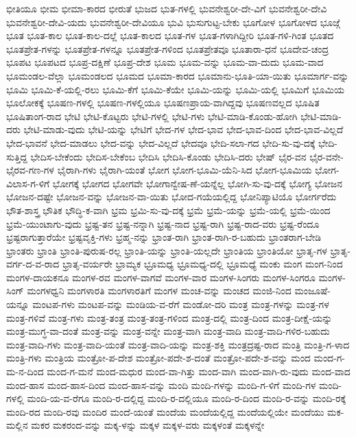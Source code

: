 {ಭೀತಿಯೂ
ಭೀಮ
ಭೀಮಾ-ಕಾರದ
ಭೀರುತೆ
ಭುಜದ
ಭುತ-ಗಳಲ್ಲಿ
ಭುವನೇಶ್ವರೀ-ದೇ-ವಿಗೆ
ಭುವನೇಶ್ವರೀ-ದೇವಿ
ಭುವನೇಶ್ವರೀ-ದೇವಿ-ಯದು
ಭುವನೇಶ್ವರೀ-ದೇವಿಯೂ
ಭುವಿ
ಭುಸುಗುಟ್ಟ-ಬೇಕು
ಭೂಗೋಳ
ಭೂಗೋಳದ
ಭೂಜ್ಗೆ
ಭೂತ
ಭೂತ-ಕಾಲ
ಭೂತ-ಕಾಲ-ದಲ್ಲೆ
ಭೂತ-ಕಾಲದ
ಭೂತ-ಗಳ
ಭೂತ-ಗಳಾಗಿದ್ದೀರಿ
ಭೂತ-ಗಳಿ-ಗಿಂತ
ಭೂತದ
ಭೂತಪ್ರೇತ-ಗಳನ್ನು
ಭೂತಪ್ರೇತ-ಗಳನ್ನೂ
ಭೂತಪ್ರೇತ-ಗಳಿಂದ
ಭೂತಪ್ರೇತವೂ
ಭೂತಾರಾ-ಧನೆ
ಭೂದೇವ-ಚಂದ್ರ
ಭೂಪಟ
ಭೂಪಟದ
ಭೂಪ್ರ-ದಕ್ಷಿಣೆ
ಭೂಪ್ರ-ದೇಶ
ಭೂಮ
ಭೂಮ-ವನ್ನು
ಭೂಮ-ವಾ-ದುದು
ಭೂಮ-ವಾದ
ಭೂಮಂಡಲ-ವೆಲ್ಲಾ
ಭೂಮಂಡಲದ
ಭೂಮದ
ಭೂಮಾ-ಕಾರದ
ಭೂಮಾನು-ಭೂತಿ-ಯಾ-ಯಿತು
ಭೂಮಾರ್ಗ-ವನ್ನು
ಭೂಮಿ
ಭೂಮಿ-ಕೆ-ಯಲ್ಲಿ-ರಲು
ಭೂಮಿ-ಕೆಗೆ
ಭೂಮಿ-ಕೆಯೇ
ಭೂಮಿ-ಯನ್ನು
ಭೂಮಿ-ಯಲ್ಲಿ
ಭೂಮಿಗೆ
ಭೂಮಿಯ
ಭೂಲೋಕಕ್ಕೆ
ಭೂಷಣ-ಗಳಲ್ಲಿ
ಭೂಷಣ-ಗಳಲ್ಲಿಯೂ
ಭೂಷಣಪ್ರಾಯ-ವಾಗಿದ್ದವು
ಭೂಷಣವಲ್ಲದ
ಭೂಷಿತ
ಭೂಷಿತಾಂಗ-ರಾದ
ಭೇಟಿ
ಭೇಟಿ-ಕೊಟ್ಟರು
ಭೇಟಿ-ಗಳಲ್ಲಿ
ಭೇಟಿ-ಗಳು
ಭೇಟಿ-ಮಾಡಿ-ಕೊಂಡು-ಹೋಗಿ
ಭೇಟಿ-ಮಾಡಿ-ದರು
ಭೇಟಿ-ಮಾಡು-ವುದು
ಭೇಟಿ-ಯನ್ನು
ಭೇಟಿಗೆ
ಭೇದ-ಗಳ
ಭೇದ-ಭಾವ
ಭೇದ-ಭಾವ-ದಿಂದ
ಭೇದ-ಭಾವ-ವಿಲ್ಲದೆ
ಭೇದ-ಭಾವನೆ
ಭೇದ-ಮಾಡಲು
ಭೇದ-ವನ್ನು
ಭೇದ-ವಿಲ್ಲದೆ
ಭೇದವೂ
ಭೇದಿ-ಸಲಾ-ಗದ
ಭೇದಿ-ಸು-ವು-ದಕ್ಕೆ
ಭೇದಿ-ಸುತ್ತಿದ್ದ
ಭೇದಿಸ-ಬೇಕೆಂದು
ಭೇದಿಸ-ಬೇಕೆಂಬ
ಭೇದಿಸಿ
ಭೇದಿಸಿ-ಕೊಂಡು
ಭೇದಿಸಿ-ದರು
ಭೇಷ್
ಭೈರ-ವನ
ಭೈರ-ವನೇ-
ಭೈರವ-ಗಣ-ಗಳ
ಭೈರಾಗಿ-ಗಳು
ಭೈರಾಗಿ-ಯಂತೆ
ಭೋಗ
ಭೋಗ-ಭೂಮಿ-ಯೆನಿ-ಸಿದ
ಭೋಗ-ಭೂಮಿಯ
ಭೋಗ-ವಿಲಾಸ-ಗ-ಳಿಗೆ
ಭೋಗಕ್ಕೆ
ಭೋಗದ
ಭೋಗವೇ
ಭೋಗಾನ್ವೇಷ-ಣೆ-ಯನ್ನೆಲ್ಲ
ಭೋಗಿ-ಸು-ವು-ದಕ್ಕೆ
ಭೋಗ್ಯ
ಭೋಜನ
ಭೋಜನ-ದಷ್ಟೇ
ಭೋಜನ-ವನ್ನು
ಭೋಜನ-ವಾ-ಯಿತು
ಭೋದ-ಗಯೆಯಲ್ಲಿದ್ದ
ಭೋನಿಪ್ಯಾಟಿಯೊ
ಭೋರ್ಗರೆದು
ಭೌತ-ಶಾಸ್ತ್ರ
ಭೌತಿಕ
ಭೌದ್ಧಿ-ಕ-ವಾಗಿ
ಭ್ರಮ
ಭ್ರಮಿ-ಸು-ವು-ದಕ್ಕೆ
ಭ್ರಮೆ
ಭ್ರಮೆ-ಯನ್ನು
ಭ್ರಮೆ-ಯಲ್ಲಿ
ಭ್ರಮೆ-ಯಿಂದ
ಭ್ರಮೆ-ಯುಂಟಾಗು-ವುದು
ಭ್ರಷ್ಟ-ತನ
ಭ್ರಷ್ಟ-ನನ್ನಾಗಿ
ಭ್ರಷ್ಟ-ನಾದ
ಭ್ರಷ್ಟ-ರಾಗಿ
ಭ್ರಷ್ಟ-ರಾದ-ವರು
ಭ್ರಷ್ಟ-ರೆಂದೂ
ಭ್ರಷ್ಟರಾಗುತ್ತಾರೆಯೇ
ಭ್ರಷ್ಟವೃಕ್ತಿ-ಗಳು
ಭ್ರಹ್ಮ-ನನ್ನು
ಭ್ರಾಂತ-ರಾಗಿ
ಭ್ರಾಂತ-ರಾಗಿ-ರ-ಬಹುದು
ಭ್ರಾಂತರಾಗ-ಬೇಡಿ
ಭ್ರಾಂತರು
ಭ್ರಾಂತಿ
ಭ್ರಾಂತಿ-ಪುರುಷ-ರಲ್ಲ
ಭ್ರಾಂತಿ-ಯನ್ನು
ಭ್ರಾಂತಿ-ಯಲ್ಲದೇ
ಭ್ರಾಂತಿಯ
ಭ್ರಾಂತಿಯೋ
ಭ್ರಾತೃ-ಗಳ
ಭ್ರಾತೃ-ವರ್ಗ-ದ-ವ-ರಾದ
ಭ್ರಾತೃ-ವರ್ಯರೇ
ಭ್ರಾಮ್ಯಕ
ಭ್ರೂಮಧ್ಯ
ಭ್ರೂಮಧ್ಯ-ದಲ್ಲಿ
ಭ್ರೂಮಧ್ಯೆ
ಮಂಕು
ಮಂಗ
ಮಂಗ-ನಿಂದ
ಮಂಗಳ-ದಾಯಕನೂ
ಮಂಗಳ-ರವ
ಮಂಗಳ-ವಾಗವೆ
ಮಂಗಳ-ವಾರ
ಮಂಗಳ-ಸಿಂಗರು
ಮಂಗಳ-ಸಿಂಗರೂ
ಮಂಗಳ-ಸಿಂಗ್
ಮಂಗಳಧ್ವನಿ
ಮಂಗಳಾರತಿ
ಮಂಗಳಾರತಿಗೆ
ಮಂಗಳ
ಮಂಚ-ವನ್ನು
ಮಂಚದ
ಮಂಜಿ-ನಿಂದ
ಮಂಜೂಷೆ-ಯನ್ನೂ
ಮಂಟಪ-ಗಳು
ಮಂಟಪ-ವನ್ನು
ಮಂಡಿಯ-ವ-ರೆಗೆ
ಮಂಡೋ-ದರಿ
ಮಂತ್ರ
ಮಂತ್ರ-ಗಳನ್ನು
ಮಂತ್ರ-ಗಳ
ಮಂತ್ರ-ಗಳಿವೆ
ಮಂತ್ರ-ಗಳು
ಮಂತ್ರ-ತಂತ್ರ
ಮಂತ್ರ-ತಂತ್ರ-ಗಳಿಂದ
ಮಂತ್ರ-ದಲ್ಲಿ
ಮಂತ್ರ-ದಿಂದ
ಮಂತ್ರ-ದೀಕ್ಷೆ-ಯನ್ನು
ಮಂತ್ರ-ಮುಗ್ಧ-ವಾ-ದಂತೆ
ಮಂತ್ರ-ವನ್ನು
ಮಂತ್ರ-ವನ್ನೇ
ಮಂತ್ರ-ವಾಗಿ
ಮಂತ್ರ-ವಾದಿ
ಮಂತ್ರ-ವಾದಿ-ಗಳಿರ-ಬಹುದು
ಮಂತ್ರ-ವಾದಿ-ಗಳು
ಮಂತ್ರ-ವಾದಿ-ಯಂತೆ
ಮಂತ್ರ-ವಾದಿ-ಯನ್ನು
ಮಂತ್ರ-ಶಕ್ತಿ
ಮಂತ್ರದ್ರಷ್ಟ-ರಾದ
ಮಂತ್ರಿ
ಮಂತ್ರಿ-ಗ-ಳಾದ
ಮಂತ್ರಿ-ಗಳು
ಮಂತ್ರಿಯ
ಮಂತ್ರೋ-ಪ-ದೇಶ
ಮಂತ್ರೋ-ಪದೇ-ಶ-ದಂತೆ
ಮಂತ್ರೋ-ಪದೇ-ಶ-ವನ್ನು
ಮಂದ
ಮಂದ-ಗ-ಮ-ನ-ದಿಂದ
ಮಂದ-ಗ-ಮನೆ
ಮಂದ-ಮಧುರ
ಮಂದ-ವಾ-ಗಿತ್ತು
ಮಂದ-ವಾಗಿ
ಮಂದ-ವಾಗಿ-ರು-ವುದು
ಮಂದ-ವಾದ
ಮಂದ-ಹಾಸ
ಮಂದ-ಹಾಸ-ದಿಂದ
ಮಂದ-ಹಾಸ-ವನ್ನು
ಮಂದಿ
ಮಂದಿ-ಗಳನ್ನು
ಮಂದಿ-ಗ-ಳಿಗೆ
ಮಂದಿ-ಗಳ
ಮಂದಿ-ಗಳಲ್ಲಿ
ಮಂದಿ-ಯ-ವ-ರೆಗೂ
ಮಂದಿ-ರ-ದಲ್ಲಿದ್ದ
ಮಂದಿ-ರ-ದಲ್ಲಿಯೂ
ಮಂದಿ-ರ-ದಿಂದ
ಮಂದಿ-ರ-ವನ್ನು
ಮಂದಿ-ರಕ್ಕೆ
ಮಂದಿ-ರದ
ಮಂದಿ-ರವು
ಮಂದಿರ
ಮಂದೆ-ಯಂತೆ
ಮಂದೆಯ
ಮಂದೆಯಲ್ಲಿದ್ದ
ಮಂದೆಯಲ್ಲಿಯೇ
ಮಂದೆಯು
ಮಕ-ಮಲ್ಲಿನ
ಮಕರ
ಮಕರಂದ-ವನ್ನು
ಮಕ್ಕ-ಳನ್ನು
ಮಕ್ಕಳ
ಮಕ್ಕಳ-ವರು
ಮಕ್ಕಳಂತೆ
ಮಕ್ಕಳನ್ನೇ
}
